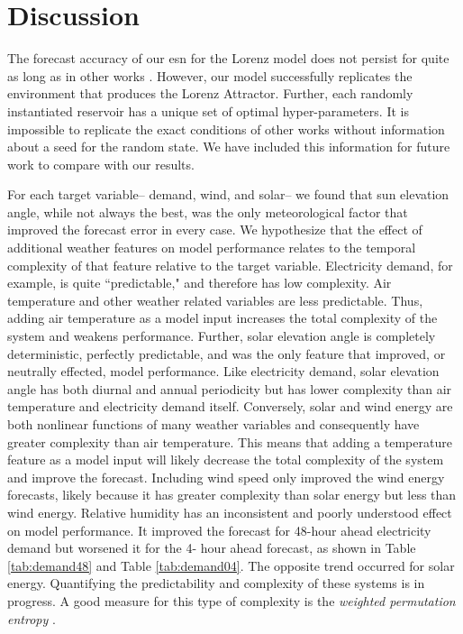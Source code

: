 \section{Discussion}

The forecast accuracy of our \gls{esn} for the Lorenz model does not persist
for quite as long as in other works \cite{pathak_using_2017}. However, our
model successfully replicates the environment that produces the Lorenz
Attractor. Further, each randomly instantiated reservoir has a unique set of
optimal hyper-parameters. It is impossible to replicate the exact conditions of
other works without information about a seed for the random state. We have
included this information for future work to compare with our results.

For each target variable-- demand, wind, and solar-- we found that sun
elevation angle, while not always the best, was the only meteorological factor
that improved the forecast error in every case. We hypothesize that the effect
of additional weather features on model performance relates to the temporal
complexity of that feature relative to the target variable. Electricity demand,
for example, is quite ``predictable," and therefore has low complexity. Air
temperature and other weather related variables are less predictable. Thus,
adding air temperature as a model input increases the total complexity of the
system and weakens performance. Further, solar elevation angle is completely
deterministic, perfectly predictable, and was the only feature that improved,
or neutrally effected, model performance. Like electricity demand, solar
elevation angle has both diurnal and annual periodicity but has lower
complexity than air temperature and electricity demand itself.
Conversely, solar and wind energy are both nonlinear functions of many weather
variables and consequently have greater complexity than air temperature. This
means that adding a temperature feature as a model input will likely decrease
the total complexity of the system and improve the forecast. Including wind
speed only improved the wind energy forecasts, likely because it has greater
complexity than solar energy but less than wind energy. Relative humidity has
an inconsistent and poorly understood effect on model performance. It improved
the forecast for 48-hour ahead electricity demand but worsened it for the 4-
hour ahead forecast, as shown in Table \ref{tab:demand48} and Table
\ref{tab:demand04}. The opposite trend occurred for solar energy.
Quantifying the predictability and complexity of these systems is in progress.
A good measure for this type of complexity is the \textit{weighted permutation
entropy}
\cite{fadlallah_weighted-permutation_2013,garland_model-free_2014, pennekamp_intrinsic_2019}.

